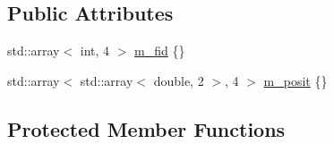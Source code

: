 \subsection*{Public Attributes}
\begin{DoxyCompactItemize}
\item 
std\+::array$<$ int, 4 $>$ \hyperlink{class_bot___controller_a397be472573c291e96f2d0b201e31643}{m\+\_\+fid} \{\}
\item 
std\+::array$<$ std\+::array$<$ double, 2 $>$, 4 $>$ \hyperlink{class_bot___controller_ac1318ffd8b630e459194f68e9a6573e2}{m\+\_\+posit} \{\}
\end{DoxyCompactItemize}
\subsection*{Protected Member Functions}
